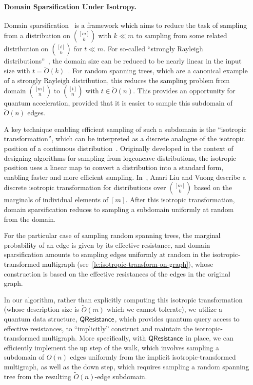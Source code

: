 \documentclass[11pt]{article}
\newcommand{\parens}[1]{( #1 )}
\newcommand{\sqb}[1]{\left[ #1 \right]}
\begin{document}
{\paragraph{Domain Sparsification Under Isotropy.}
Domain sparsification~\cite{anari2020isotropy,anari2021domain,ALV22} is a
framework which aims to reduce the task of sampling from a distribution on
$\binom{\sqb{m}}{k}$ with $k \ll m$ to sampling from some related distribution
on $\binom{\sqb{t}}{k}$ for $t \ll m$.
For so-called ``strongly Rayleigh distributions''~\cite{borcea2009negative}, the
domain size can be reduced to be nearly linear in the input size with
$t=\widetilde O \parens{k}$~\cite{ALV22}.
For random spanning trees, which are a canonical example of a strongly Rayleigh
distribution, this reduces the sampling problem from domain $\binom{\sqb{m}}{n}$
to $\binom{\sqb{t}}{n}$ with $t \in \widetilde O(n)$.
This provides an opportunity for quantum acceleration, provided that it is
easier to sample this subdomain of $\widetilde O(n)$ edges.

A key technique enabling efficient sampling of such a subdomain is the
``isotropic transformation'', which can be interpreted as a discrete analogue of
the isotropic position of a continuous
distribution~\cite{rudelson1999random,lee2024eldan}.
Originally developed in the context of designing algorithms for sampling from
logconcave distributions, the isotropic position uses a linear map to convert a
distribution into a standard form, enabling faster and more efficient sampling.
In~\cite{ALV22}, Anari Liu and Vuong describe a discrete isotropic
transformation for distributions over $\binom{\sqb{m}}{k}$ based on the
marginals of individual elements of $\sqb{m}$.
After this isotropic transformation, domain sparsification reduces to sampling a
subdomain uniformly at random from the domain.

For the particular case of sampling random spanning trees, the marginal
probability of an edge is given by its effective resistance, and domain
sparsification amounts to sampling edges uniformly at random in the
isotropic-transformed multigraph (see~\cref{le:isotropic-transform-on-graph}),
whose construction is based on the effective resistances of the edges in the
original graph.

In our algorithm, rather than explicitly computing this isotropic transformation
(whose description size is $\widetilde O(m)$ which we cannot tolerate), we
utilize a quantum data structure, $\mathsf{QResistance}$, which provides quantum
query access to effective resistances, to ``implicitly'' construct and maintain
the isotropic-transformed multigraph.
More specifically, with $\mathsf{QResistance}$ in place, we can efficiently
implement the up step of the walk, which involves sampling a subdomain of $O(n)$
edges uniformly from the implicit isotropic-transformed multigraph, as well as
the down step, which requires sampling a random spanning tree from the resulting
$\widetilde O(n)$-edge subdomain.

}
\end{document}
